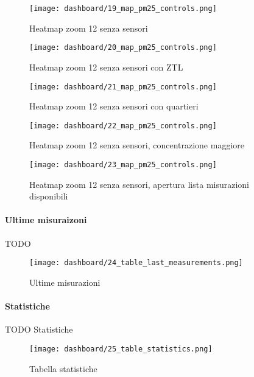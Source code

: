 \begin{figure}[H]
  \centering
  \texttt{[image: dashboard/19\_map\_pm25\_controls.png]}
  \caption{Heatmap zoom 12 senza sensori}
  \label{fig:app-map-pm25-controls-19}

  \hfill

  \texttt{[image: dashboard/20\_map\_pm25\_controls.png]}
  \caption{Heatmap zoom 12 senza sensori con ZTL}
  \label{fig:app-map-pm25-controls-20}
\end{figure}

\begin{figure}[H]
  \centering
  \texttt{[image: dashboard/21\_map\_pm25\_controls.png]}
  \caption{Heatmap zoom 12 senza sensori con quartieri}
  \label{fig:app-map-pm25-controls-21}

  \hfill

  \texttt{[image: dashboard/22\_map\_pm25\_controls.png]}
  \caption{Heatmap zoom 12 senza sensori, concentrazione maggiore}
  \label{fig:app-map-pm25-controls-22}
\end{figure}

\begin{figure}[H]
  \centering
  \texttt{[image: dashboard/23\_map\_pm25\_controls.png]}
  \caption{Heatmap zoom 12 senza sensori, apertura lista misurazioni disponibili}
  \label{fig:app-map-pm25-controls-23}
\end{figure}

\paragraph{Ultime misuraizoni}

TODO

\begin{figure}[H]
  \centering
  \texttt{[image: dashboard/24\_table\_last\_measurements.png]}
  \caption{Ultime misurazioni}
  \label{fig:app-tab-last-measurements}
\end{figure}
\paragraph{Statistiche}

TODO Statistiche

\begin{figure}[H]
  \centering
  \texttt{[image: dashboard/25\_table\_statistics.png]}
  \caption{Tabella statistiche}
  \label{fig:app-tab-statistics}
\end{figure}

